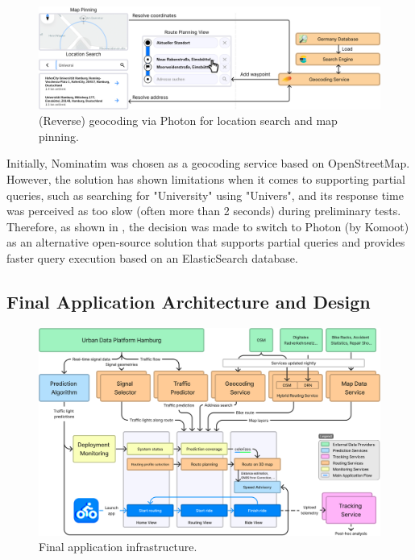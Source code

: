 \begin{figure}[htbp]
\centering
\includegraphics[width=\linewidth]{images/routing-view-geocoding.png}
\caption{(Reverse) geocoding via Photon for location search and map pinning.}
\label{fig:routing-view-geocoding}
\end{figure}

Initially, Nominatim was chosen as a geocoding service based on OpenStreetMap. However, the solution has shown limitations when it comes to supporting partial queries, such as searching for "University" using "Univers", and its response time was perceived as too slow (often more than 2 seconds) during preliminary tests. Therefore, as shown in , the decision was made to switch to Photon (by Komoot) as an alternative open-source solution that supports partial queries and provides faster query execution based on an ElasticSearch database.

\subsection{Final Application Architecture and Design}

\begin{figure}[htbp]
\caption{Final application infrastructure.}\label{fig:architecture}
\includegraphics[width=\linewidth]{images/architecture.png}
\end{figure}

